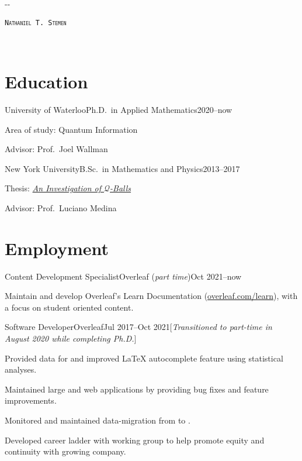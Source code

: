 \documentclass{cultvoucher}
\begin{document}
\begin{adjustwidth}{\dimexpr-\marginparsep-\marginparwidth}{}
	\begin{center}
		\textsc{\texttt{\HUGE Nathaniel T. Stemen}}

		 \separator{}\, 
	\end{center}
\end{adjustwidth}

\section{Education}

\begin{entry}{University of Waterloo}{Ph.D.\ in Applied Mathematics}{2020--now}
	\item Area of study: Quantum Information
	\item Advisor: Prof.\ Joel Wallman
\end{entry}

\begin{entry}{New York University}{B.Sc.\ in Mathematics and Physics}{2013--2017}
	\item Thesis: \href{https://natestemen.xyz/qv-thesis.pdf}{\textit{An Investigation of $\mathcal{Q}$-Balls}}
	\item Advisor: Prof.\ Luciano Medina
\end{entry}

\section{Employment}
\begin{entry}{Content Development Specialist}{Overleaf (\emph{part time})}{Oct 2021--now}
	\item Maintain and develop Overleaf's Learn Documentation (\url{overleaf.com/learn}), with a focus on student oriented content.
\end{entry}

\begin{entry}{Software Developer}{Overleaf}{Jul 2017--Oct 2021}[\emph{Transitioned to part-time in August 2020 while completing Ph.D.}]
	\item Provided data for and improved \LaTeX{} autocomplete feature using statistical analyses.
	\item Maintained large  and  web applications by providing bug fixes and feature improvements.
	\item Monitored and maintained data-migration from  to .
	\item Developed career ladder with working group to help promote equity and continuity with growing company.
\end{entry}
\end{document}
